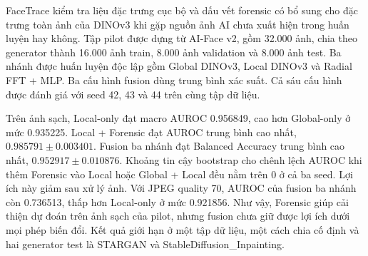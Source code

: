 FaceTrace kiểm tra liệu đặc trưng cục bộ và dấu vết forensic có bổ sung cho đặc trưng toàn ảnh của DINOv3 khi gặp nguồn ảnh AI chưa xuất hiện trong huấn luyện hay không. Tập pilot được dựng từ AI-Face v2, gồm 32.000 ảnh, chia theo generator thành 16.000 ảnh train, 8.000 ảnh validation và 8.000 ảnh test. Ba nhánh được huấn luyện độc lập gồm Global DINOv3, Local DINOv3 và Radial FFT + MLP. Ba cấu hình fusion dùng trung bình xác suất. Cả sáu cấu hình được đánh giá với seed 42, 43 và 44 trên cùng tập dữ liệu.

Trên ảnh sạch, Local-only đạt macro AUROC 0.956849, cao hơn Global-only ở mức 0.935225. Local + Forensic đạt AUROC trung bình cao nhất, $0.985791\pm0.003401$. Fusion ba nhánh đạt Balanced Accuracy trung bình cao nhất, $0.952917\pm0.010876$. Khoảng tin cậy bootstrap cho chênh lệch AUROC khi thêm Forensic vào Local hoặc Global + Local đều nằm trên 0 ở cả ba seed. Lợi ích này giảm sau xử lý ảnh. Với JPEG quality 70, AUROC của fusion ba nhánh còn 0.736513, thấp hơn Local-only ở mức 0.921856. Như vậy, Forensic giúp cải thiện dự đoán trên ảnh sạch của pilot, nhưng fusion chưa giữ được lợi ích dưới mọi phép biến đổi. Kết quả giới hạn ở một tập dữ liệu, một cách chia cố định và hai generator test là STARGAN và StableDiffusion\_\allowbreak Inpainting.
